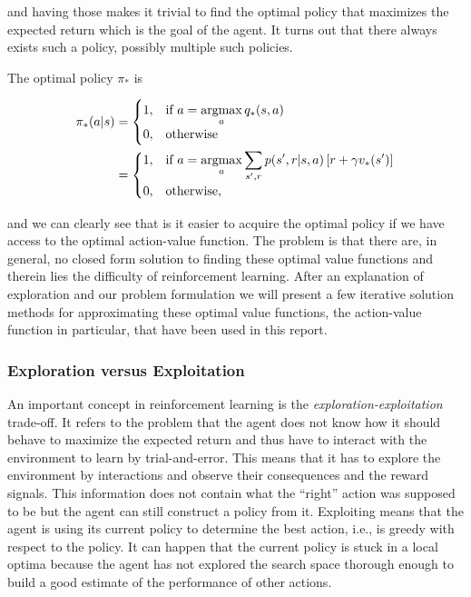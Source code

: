 \documentclass[result.tex]{subfiles}
\begin{document}
    and having those makes it trivial to find the optimal policy that maximizes the expected return which is the goal of the agent. It turns out that there always exists such a policy, possibly multiple such policies.

    The optimal policy $\pi_\ast$ is

    \begin{align*}
        \pi_\ast(a | s) &=
        \begin{cases}
            1, & \text{if}\ a = \displaystyle\operatorname*{argmax}_{a} q_\ast(s, a) \\
            0, & \text{otherwise}
        \end{cases} \\
        &=
        \begin{cases}
            1, & \text{if}\ a = \displaystyle\operatorname*{argmax}_{a} \sum_{s^\prime, r} p(s^\prime, r | s, a) \left[ r + \gamma v_\ast(s^\prime) \right] \\
            0, & \text{otherwise},
        \end{cases} \\
    \end{align*}

    and we can clearly see that is it easier to acquire the optimal policy if we have access to the optimal action-value function. The problem is that there are, in general, no closed form solution to finding these optimal value functions and therein lies the difficulty of reinforcement learning. After an explanation of exploration and our problem formulation we will present a few iterative solution methods for approximating these optimal value functions, the action-value function in particular, that have been used in this report.

    \subsubsection*{Exploration versus Exploitation}

    An important concept in reinforcement learning is the \textit{exploration-exploitation} trade-off. It refers to the problem that the agent does not know how it should behave to maximize the expected return and thus have to interact with the environment to learn by trial-and-error. This means that it has to explore the environment by interactions and observe their consequences and the reward signals. This information does not contain what the \enquote{right} action was supposed to be but the agent can still construct a policy from it. Exploiting means that the agent is using its current policy to determine the best action, i.e., is greedy with respect to the policy. It can happen that the current policy is stuck in a local optima because the agent has not explored the search space thorough enough to build a good estimate of the performance of other actions.
\end{document}
